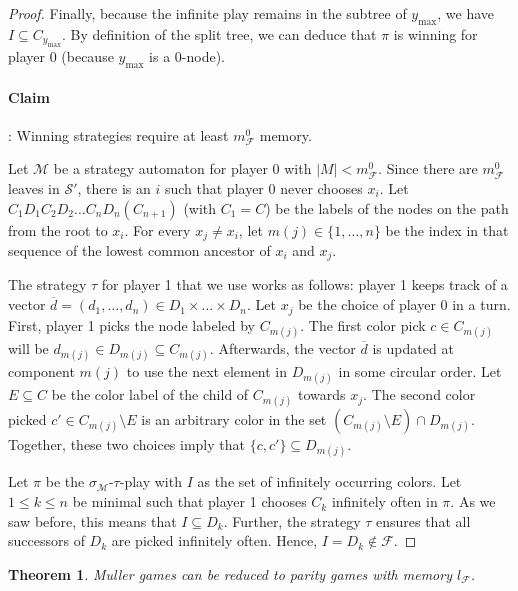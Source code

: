 \documentclass{article}
\newtheorem{theorem}{Theorem}
\begin{document}
\begin{proof}
	Finally, because the infinite play remains in the subtree of $y_{\max}$, we have $I \subseteq C_{y_{\max}}$. By definition of the split tree, we can deduce that $\pi$ is winning for player 0 (because $y_{\max}$ is a 0-node).
	
	\paragraph{Claim}: Winning strategies require at least $m^0_\mathcal{F}$ memory.
	
	Let $\mathcal{M}$ be a strategy automaton for player 0 with $|M| < m^0_\mathcal{F}$. Since there are $m^0_\mathcal{F}$ leaves in $\mathcal{S}'$, there is an $i$ such that player 0 never chooses $x_i$. Let $C_1 D_1 C_2 D_2 \dots C_n D_n (C_{n+1})$ (with $C_1 = C$) be the labels of the nodes on the path from the root to $x_i$. For every $x_j \neq x_i$, let $m(j) \in \{1, \dots, n\}$ be the index in that sequence of the lowest common ancestor of $x_i$ and $x_j$.
	
	The strategy $\tau$ for player 1 that we use works as follows: player 1 keeps track of a vector $\overline{d} = (d_1, \dots, d_n) \in D_1 \times \dots \times D_n$. Let $x_j$ be the choice of player 0 in a turn. First, player 1 picks the node labeled by $C_{m(j)}$. The first color pick $c \in C_{m(j)}$ will be $d_{m(j)} \in D_{m(j)} \subseteq C_{m(j)}$. Afterwards, the vector $\overline{d}$ is updated at component $m(j)$ to use the next element in $D_{m(j)}$ in some circular order. Let $E \subseteq C$ be the color label of the child of $C_{m(j)}$ towards $x_j$. The second color picked $c' \in C_{m(j)} \setminus E$ is an arbitrary color in the set $(C_{m(j)} \setminus E) \cap D_{m(j)}$. Together, these two choices imply that $\{c,c'\} \subseteq D_{m(j)}$.
	
	Let $\pi$ be the $\sigma_\mathcal{M}$-$\tau$-play with $I$ as the set of infinitely occurring colors. Let $1 \leq k \leq n$ be minimal such that player 1 chooses $C_k$ infinitely often in $\pi$. As we saw before, this means that $I \subseteq D_k$. Further, the strategy $\tau$ ensures that all successors of $D_k$ are picked infinitely often. Hence, $I = D_k \notin \mathcal{F}$.
\end{proof}

\vspace{0.5cm}
\begin{theorem}
	Muller games can be reduced to parity games with memory $l_\mathcal{F}$.
\end{theorem}
\end{document}
